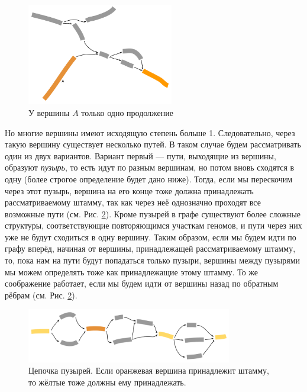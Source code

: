 \documentclass{spbau-diploma}
\begin{document}
\begin{figure}[t]
\centering
\includegraphics[width=0.57\textwidth]{pics/one_continue.png}
\caption{У вершины $A$ только одно продолжение}
\label{one_continue}
\end{figure}

Но многие вершины имеют исходящую степень больше 1. Следовательно, через такую вершину существует несколько путей. В таком случае будем рассматривать один из двух вариантов. Вариант первый --- пути, выходящие из вершины, образуют \textit{пузырь}, то есть идут по разным вершинам, но потом вновь сходятся в одну (более строгое определение будет дано ниже). Тогда, если мы перескочим через этот пузырь, вершина на его конце тоже должна принадлежать рассматриваемому штамму, так как через неё однозначно проходят все возможные пути (см. Рис. \ref{bubbles_chain}). Кроме пузырей в графе существуют более сложные структуры, соответствующие повторяющимся участкам геномов, и пути через них уже не будут сходиться в одну вершину. Таким образом, если мы будем идти по графу вперёд, начиная от вершины, принадлежащей рассматриваемому штамму, то, пока нам на пути будут попадаться только пузыри, вершины между пузырями мы можем определять тоже как принадлежащие этому штамму. То же соображение работает, если мы будем идти от вершины назад по обратным рёбрам (см. Рис. \ref{bubbles_chain}).

\begin{figure}[t]
\centering
\includegraphics[width=0.8\textwidth]{pics/bubbles_chain.png}
\caption{Цепочка пузырей. Если оранжевая вершина принадлежит штамму, то жёлтые тоже должны ему принадлежать.}
\label{bubbles_chain}
\end{figure}
\end{document}
